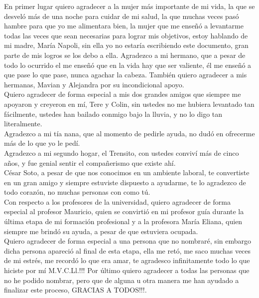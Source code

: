 En primer lugar quiero agradecer a la mujer más importante de mi  vida,  la que se desveló más de una noche  para cuidar de mi salud, la que muchas veces pasó hambre para que yo me alimentara bien, la mujer que me enseñó a levantarme todas las veces que sean necesarias para lograr mis objetivos, estoy hablando de mi madre, María Napoli, sin ella yo no  estaría escribiendo este documento, gran parte de mis logros se los debo a ella. Agradezco a mi hermano,  que a pesar de todo lo ocurrido el me enseñó que en la vida hay que ser valiente, él me enseñó a que pase lo que pase, nunca agachar la cabeza. También quiero agradecer a mis hermanas, Mavian y Alejandra por su incondicional apoyo.
\\

Quiero agradecer de forma especial a mis dos grandes amigos que siempre me apoyaron y creyeron en mí, Tere y Colin, sin ustedes  no me hubiera levantado tan fácilmente, ustedes han  bailado conmigo bajo la lluvia, y no lo digo tan literalmente.\\

Agradezco a mi tía nana, que al momento de pedirle ayuda, no dudó en ofrecerme más de lo que yo le pedí.\\
Agradezco a mi segundo hogar, el Trensito,  con ustedes conviví más de cinco años, y fue genial sentir el compañerismo que existe ahí.
\\

César Soto, a pesar de que nos conocimos en un ambiente laboral, te convertiste en un gran amigo y siempre estuviste dispuesto a ayudarme, te lo agradezco de todo corazón, no muchas personas con como tú.\\


Con respecto a los profesores de la universidad, quiero agradecer de forma especial al profesor Mauricio, quien se convirtió en mi profesor guía durante la última etapa de mi formación profesional y a la profesora María Eliana, quien siempre me brindó su ayuda, a pesar de que estuviera ocupada.\\

Quiero agradecer de forma especial a una persona que no nombraré, sin embargo dicha persona apareció al final de esta etapa, ella me retó, me saco muchas veces de mi estrés, me recordó lo que era amar, te agradesco infinitamente todo lo que hiciste por mí M.V.C.Ll.!!! 
Por último quiero agradecer a todas las personas que no he podido nombrar, pero que de alguna u otra  manera me han ayudado  a finalizar este proceso, GRACIAS A TODOS!!!.


 
 
 
 
 